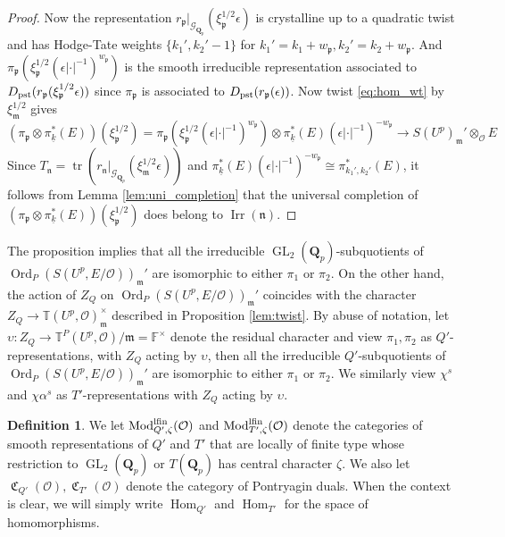 \documentclass[leqno]{amsart}
\theoremstyle{definition}
\newtheorem{defn}[thm]{Definition}
\theoremstyle{remark}
\newcommand{\oo}{\mathcal{O}}
\newcommand{\fF}{\mathbb{F}} %
\newcommand{\Qp}{\mathbf{Q}_p}
\DeclareMathOperator{\Hom}{Hom}
\DeclareMathOperator{\GL}{GL}
\DeclareMathOperator{\mtr}{tr}
\newcommand{\pst}{\textnormal{pst}}
\newcommand{\fm}{\mathfrak{m}}
\newcommand{\fn}{\mathfrak{n}}
\newcommand{\fp}{\mathfrak{p}}
\DeclareMathOperator{\Mod}{\textnormal{Mod}}
\DeclareMathOperator{\fC}{\mathfrak{C}} %
\DeclareMathOperator{\Ord}{Ord} %
\DeclareMathOperator{\Irr}{Irr}
\newcommand{\Gp}{\mathcal{G}_{\Qp}} %
\newcommand{\lfin}{\textnormal{lfin}}
\newcommand{\wt}[1]{\underline{ #1 }}
\newcommand{\TT}{\mathbb{T}} %
\begin{document}
\begin{proof}
Now the representation
$r_{\fp}\vert_{\Gp}(\xi_{\fp}^{1/2}\epsilon)$
is crystalline up to a quadratic twist
and has Hodge-Tate weights  $\{k_1',k_2'-1\}$ 
for $k_1'=k_1+w_\fp, k_2'=k_2+w_\fp$.
And $\pi_\fp(\xi_\fp^{1/2}(\epsilon|\cdot|^{-1})^{w_\fp})$
is the smooth irreducible
representation associated to 
$D_{\pst}(r_{\fp}(\xi_\fp^{1/2}\epsilon))$
since $\pi_\fp$ is associated to 
$D_{\pst}(r_{\fp}(\epsilon))$.
Now twist \eqref{eq:hom_wt} by $\xi_\fm^{1/2}$ gives
\[
    (\pi_{\fp}\otimes \pi_{\wt{k}}^*(E))(\xi_\fp^{1/2})=
    \pi_\fp(\xi_\fp^{1/2}(\epsilon|\cdot|^{-1})^{w_\fp})
    \otimes \pi_{\wt{k}}^*(E)(\epsilon|\cdot|^{-1})^{-w_{\fp}} \to 
    S(U^p)_\fm'\otimes_{\oo}E
\]
Since  $T_\fn=\mtr(r_{\fn}\vert_{\Gp}(\xi_\fm^{1/2}\epsilon))$
and $\pi_{\wt{k}}^*(E)(\epsilon|\cdot|^{-1})^{-w_{\fp}}\cong 
\pi_{k_1',k_2'}^*(E)$,
it follows from Lemma \ref{lem:uni_completion}
that the universal completion of 
$(\pi_{\fp}\otimes \pi_{\wt{k}}^*(E))(\xi_\fp^{1/2})$
does belong to $\Irr(\fn)$.
\end{proof}

The proposition implies that
all the irreducible $\GL_2(\Qp)$-subquotients
of $\Ord_P(S(U^p,E/\oo))_\fm'$ are 
isomorphic to either $\pi_1$ or $\pi_2$.
On the other hand, the action of $Z_Q$
on $\Ord_P(S(U^p,E/\oo))_\fm'$ coincides 
with the character 
$Z_Q\to \TT(U^p,\oo)_{\fm}^{\times}$
described in Proposition \ref{lem:twist}.
By abuse of notation,
let $\upsilon\colon Z_Q\to \TT^P(U^p,\oo)/\fm=\fF^\times$
denote the residual character
and view $\pi_1,\pi_2$
as $Q'$-representations,
with $Z_Q$ acting by $\upsilon$,
then all the irreducible $Q'$-subquotients
of $\Ord_P(S(U^p,E/\oo))_\fm'$ are 
isomorphic to either $\pi_1$ or $\pi_2$.
We similarly view $\chi^s$ and $\chi\alpha^s$
as $T'$-representations
with $Z_Q$ acting by $\upsilon$.

\begin{defn}

We let $\Mod^{\lfin}_{Q',\zeta}(\oo)$
and $\Mod^{\lfin}_{T',\zeta}(\oo)$
denote the categories of smooth representations of 
$Q'$ and $T'$ that are locally of finite type
whose restriction to $\GL_2(\Qp)$ or $T(\Qp)$
has central character $\zeta$.
We also let $\fC_{Q'}(\oo), \fC_{T'}(\oo)$
denote the category of Pontryagin duals.
When the context is clear,
we will simply write $\Hom_{Q'}$ and $\Hom_{T'}$
for the space of homomorphisms.
\end{defn}
\end{document}
